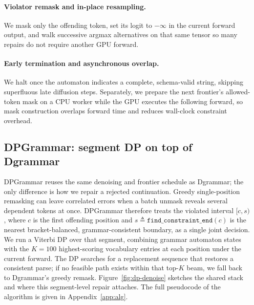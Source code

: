 \paragraph{Violator remask and in-place resampling.}
We mask only the offending token, set its logit to $-\infty$ in the current forward output, and walk successive argmax alternatives on that same tensor so many repairs do not require another GPU forward.

\paragraph{Early termination and asynchronous overlap.}
We halt once the automaton indicates a complete, schema-valid string, skipping superfluous late diffusion steps. Separately, we prepare the next frontier's allowed-token mask on a CPU worker while the GPU executes the following forward, so mask construction overlaps forward time and reduces wall-clock constraint overhead.

\subsection{DPGrammar: segment DP on top of Dgrammar}
\label{sec:dpg}
DPGrammar reuses the same denoising and frontier schedule as Dgrammar; the only difference is how we repair a rejected continuation. Greedy single-position remasking can leave correlated errors when a batch unmask reveals several dependent tokens at once. DPGrammar therefore treats the violated interval $[c,s)$, where $c$ is the first offending position and $s \triangleq \texttt{find\_constraint\_end}(c)$ is the nearest bracket-balanced, grammar-consistent boundary, as a single joint decision. We run a Viterbi DP over that segment, combining grammar automaton states with the $K{=}100$ highest-scoring vocabulary entries at each position under the current forward. The DP searches for a replacement sequence that restores a consistent parse; if no feasible path exists within that top-$K$ beam, we fall back to Dgrammar's greedy remask. Figure~\ref{fig:dp-denoise} sketches the shared stack and where this segment-level repair attaches. The full pseudocode of the algorithm is given in Appendix~\ref{app:alg}.


